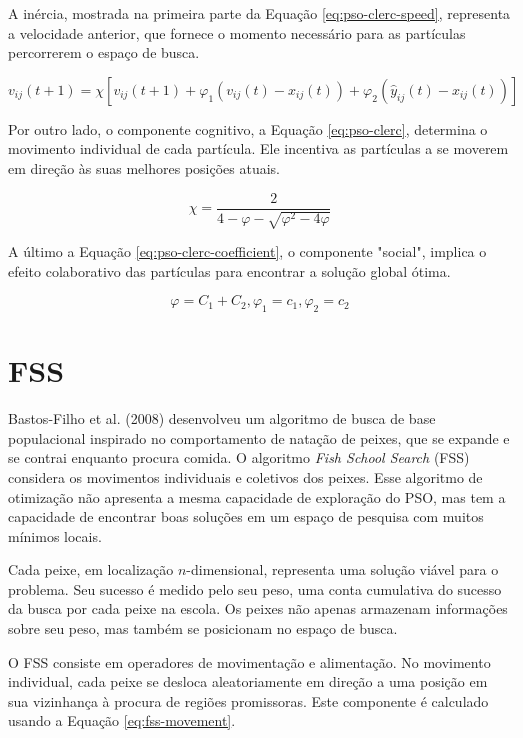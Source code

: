 A inércia, mostrada na primeira parte da Equação \ref{eq:pso-clerc-speed}, representa a velocidade anterior, que fornece o momento necessário para as partículas percorrerem o espaço de busca.

\begin{equation} \label{eq:pso-clerc-speed}
    v_{ij}(t+1) = \chi[v_{ij}(t+1) + \varphi_1(v_{ij}(t) - x_{ij}(t)) + \varphi_2(\hat{y}_{ij}(t) - x_{ij}(t))]
\end{equation}

Por outro lado, o componente cognitivo, a Equação \ref{eq:pso-clerc}, determina o movimento individual de cada partícula. Ele incentiva as partículas a se moverem em direção às suas melhores posições atuais. 

\begin{equation} \label{eq:pso-clerc}
    \chi = \frac{2}{4 - \varphi - \sqrt{\varphi^2 - 4\varphi}}
\end{equation}

A último a Equação \ref{eq:pso-clerc-coefficient}, o componente "social", implica o efeito colaborativo das partículas para encontrar a solução global ótima.

\begin{equation} \label{eq:pso-clerc-coefficient}
    \varphi = C_1 + C_2, \varphi_1 = c_1, \varphi_2 = c_2
\end{equation}

\section{FSS}
\label{sec-fss}

Bastos-Filho et al. (2008) \cite{bastos2008novel} desenvolveu um algoritmo de busca de base populacional inspirado no comportamento de natação de peixes, que se expande e se contrai enquanto procura comida. O algoritmo \textit{Fish School Search} (FSS) considera os movimentos individuais e coletivos dos peixes. Esse algoritmo de otimização não apresenta a mesma capacidade de exploração do PSO, mas tem a capacidade de encontrar boas soluções em um espaço de pesquisa com muitos mínimos locais.

Cada peixe, em localização $n$-dimensional, representa uma solução viável para o problema. Seu sucesso é medido pelo seu peso, uma conta cumulativa do sucesso da busca por cada peixe na escola. Os peixes não apenas armazenam informações sobre seu peso, mas também se posicionam no espaço de busca.

O FSS consiste em operadores de movimentação e alimentação. No movimento individual, cada peixe se desloca aleatoriamente em direção a uma posição em sua vizinhança à procura de regiões promissoras. Este componente é calculado usando a Equação \ref{eq:fss-movement}.

